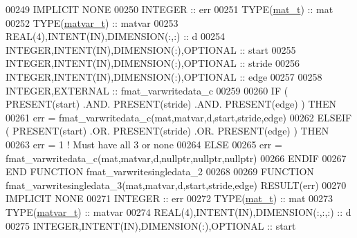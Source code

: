 \begin{DoxyCode}
00249 \textcolor{keywordtype}{IMPLICIT NONE}
00250     \textcolor{keywordtype}{INTEGER}                                  :: err
00251     \textcolor{keywordtype}{TYPE}(\hyperlink{group___m_a_t_gab0fc888f5a5d79943b16284b1f91c2e8}{mat\_t})                              :: mat
00252     \textcolor{keywordtype}{TYPE}(\hyperlink{group___m_a_t_structmatvar__t}{matvar\_t})                           :: matvar
00253     \textcolor{keywordtype}{REAL(4)},\textcolor{keywordtype}{INTENT(IN)},\textcolor{keywordtype}{DIMENSION(:,:)}        :: d
00254     \textcolor{keywordtype}{INTEGER},\textcolor{keywordtype}{INTENT(IN)},\textcolor{keywordtype}{DIMENSION(:)},\textcolor{keywordtype}{OPTIONAL} :: start
00255     \textcolor{keywordtype}{INTEGER},\textcolor{keywordtype}{INTENT(IN)},\textcolor{keywordtype}{DIMENSION(:)},\textcolor{keywordtype}{OPTIONAL} :: stride
00256     \textcolor{keywordtype}{INTEGER},\textcolor{keywordtype}{INTENT(IN)},\textcolor{keywordtype}{DIMENSION(:)},\textcolor{keywordtype}{OPTIONAL} :: edge
00257 
00258     \textcolor{keywordtype}{INTEGER},\textcolor{keywordtype}{EXTERNAL}                         :: fmat\_varwritedata\_c
00259 
00260     \textcolor{keywordflow}{IF} ( \textcolor{keyword}{PRESENT}(start) .AND. \textcolor{keyword}{PRESENT}(stride) .AND. \textcolor{keyword}{PRESENT}(edge) ) \textcolor{keywordflow}{THEN}
00261         err = fmat\_varwritedata\_c(mat,matvar,d,start,stride,edge)
00262     \textcolor{keywordflow}{ELSEIF} ( \textcolor{keyword}{PRESENT}(start) .OR. \textcolor{keyword}{PRESENT}(stride) .OR. \textcolor{keyword}{PRESENT}(edge) ) \textcolor{keywordflow}{THEN}
00263         err = 1    \textcolor{comment}{! Must have all 3 or none}
00264     \textcolor{keywordflow}{ELSE}
00265         err = fmat\_varwritedata\_c(mat,matvar,d,nullptr,nullptr,nullptr)
00266 \textcolor{keywordflow}{    ENDIF}
00267 \textcolor{keyword}{END FUNCTION }fmat\_varwritesingledata\_2
00268 
00269 \textcolor{keyword}{FUNCTION }fmat\_varwritesingledata\_3(mat,matvar,d,start,stride,edge) \textcolor{keyword}{RESULT}(err)
00270 \textcolor{keywordtype}{IMPLICIT NONE}
00271     \textcolor{keywordtype}{INTEGER}                                  :: err
00272     \textcolor{keywordtype}{TYPE}(\hyperlink{group___m_a_t_gab0fc888f5a5d79943b16284b1f91c2e8}{mat\_t})                              :: mat
00273     \textcolor{keywordtype}{TYPE}(\hyperlink{group___m_a_t_structmatvar__t}{matvar\_t})                           :: matvar
00274     \textcolor{keywordtype}{REAL(4)},\textcolor{keywordtype}{INTENT(IN)},\textcolor{keywordtype}{DIMENSION(:,:,:)}      :: d
00275     \textcolor{keywordtype}{INTEGER},\textcolor{keywordtype}{INTENT(IN)},\textcolor{keywordtype}{DIMENSION(:)},\textcolor{keywordtype}{OPTIONAL} :: start

\end{DoxyCode}
